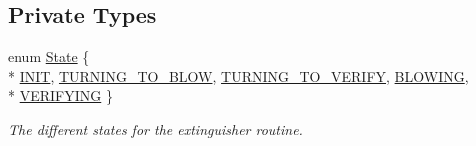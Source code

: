 \subsection*{Private Types}
\begin{DoxyCompactItemize}
\item 
enum \hyperlink{classExtinguisher_a969a7cce3382fc5d67f687540896e3ab}{State} \{ \\*
\hyperlink{classExtinguisher_a969a7cce3382fc5d67f687540896e3aba25f6661e71a4e779393f9e1d0afdb9cd}{I\-N\-I\-T}, 
\hyperlink{classExtinguisher_a969a7cce3382fc5d67f687540896e3aba2ff965592f07601418ca89485f335cb2}{T\-U\-R\-N\-I\-N\-G\-\_\-\-T\-O\-\_\-\-B\-L\-O\-W}, 
\hyperlink{classExtinguisher_a969a7cce3382fc5d67f687540896e3aba1defb0b77459569c811478b71cbbf13e}{T\-U\-R\-N\-I\-N\-G\-\_\-\-T\-O\-\_\-\-V\-E\-R\-I\-F\-Y}, 
\hyperlink{classExtinguisher_a969a7cce3382fc5d67f687540896e3aba9d3fa0261c6cf909a97ca68eee27ed0d}{B\-L\-O\-W\-I\-N\-G}, 
\\*
\hyperlink{classExtinguisher_a969a7cce3382fc5d67f687540896e3aba5152bb2f7b6f5f9f8b53204d0ae61ddd}{V\-E\-R\-I\-F\-Y\-I\-N\-G}
 \}
\begin{DoxyCompactList}\small\item\em The different states for the extinguisher routine. \end{DoxyCompactList}\end{DoxyCompactItemize}
